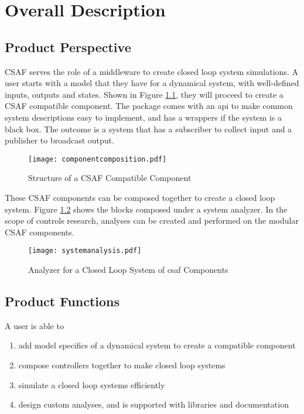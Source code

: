 \chapter{Overall Description}

\section{Product Perspective}

CSAF serves the role of a middleware to create closed loop system simulations. A user starts with a model that they have for a dynamical system, with well-defined inputs, outputs and states. Shown in Figure \ref{fig:ccomp}, they will proceed to create a CSAF compatible component. The package comes with an \acrshort{api} to make common system descriptions easy to implement, and has a wrappers if the system is a black box. The outcome is a system that has a subscriber to collect input and a publisher to broadcast output. \\

\begin{figure}
\centering
\texttt{[image: componentcomposition.pdf]}
\caption{Structure of a CSAF Compatible Component}
\label{fig:ccomp}
\end{figure}

These CSAF components can be composed together to create a closed loop system. Figure \ref{fig:csys} shows the blocks composed under a system analyzer. In the scope of controls research, analyses can be created and performed on the modular CSAF components. \\

\begin{figure}
\centering
\texttt{[image: systemanalysis.pdf]}
\caption{Analyzer for a Closed Loop System of \acrshort{csaf} Components }
\label{fig:csys}
\end{figure}


\section{Product Functions}

A user is able to

\begin{enumerate}
\item add model specifics of a dynamical system to create a compatible component
\item compose controllers together to make closed loop systems
\item simulate a closed loop systems efficiently
\item design custom analyses, and is supported with libraries and documentation
\end{enumerate}

